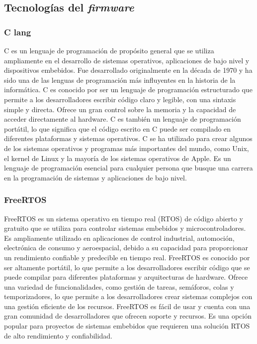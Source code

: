 \newpage
\subsection{Tecnologías del \textit{firmware}}


\subsubsection{C lang}

C es un lenguaje de programación de propósito general que se utiliza ampliamente en el desarrollo de sistemas operativos, aplicaciones de bajo nivel y dispositivos embebidos. Fue desarrollado originalmente en la década de 1970 y ha sido una de las lenguas de programación más influyentes en la historia de la informática. C es conocido por ser un lenguaje de programación estructurado que permite a los desarrolladores escribir código claro y legible, con una sintaxis simple y directa. Ofrece un gran control sobre la memoria y la capacidad de acceder directamente al hardware. C es también un lenguaje de programación portátil, lo que significa que el código escrito en C puede ser compilado en diferentes plataformas y sistemas operativos. C se ha utilizado para crear algunos de los sistemas operativos y programas más importantes del mundo, como Unix, el kernel de Linux y la mayoría de los sistemas operativos de Apple. Es un lenguaje de programación esencial para cualquier persona que busque una carrera en la programación de sistemas y aplicaciones de bajo nivel.


\subsubsection{FreeRTOS}

FreeRTOS es un sistema operativo en tiempo real (RTOS) de código abierto y gratuito que se utiliza para controlar sistemas embebidos y microcontroladores. Es ampliamente utilizado en aplicaciones de control industrial, automoción, electrónica de consumo y aeroespacial, debido a su capacidad para proporcionar un rendimiento confiable y predecible en tiempo real. FreeRTOS es conocido por ser altamente portátil, lo que permite a los desarrolladores escribir código que se puede compilar para diferentes plataformas y arquitecturas de hardware. Ofrece una variedad de funcionalidades, como gestión de tareas, semáforos, colas y temporizadores, lo que permite a los desarrolladores crear sistemas complejos con una gestión eficiente de los recursos. FreeRTOS es fácil de usar y cuenta con una gran comunidad de desarrolladores que ofrecen soporte y recursos. Es una opción popular para proyectos de sistemas embebidos que requieren una solución RTOS de alto rendimiento y confiabilidad.


